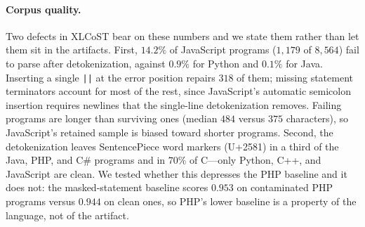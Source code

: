 \paragraph{Corpus quality.} Two defects in XLCoST bear on these numbers
and we state them rather than let them sit in the artifacts. First,
$14.2\%$ of JavaScript programs ($1{,}179$ of $8{,}564$) fail to parse
after detokenization, against $0.9\%$ for Python and $0.1\%$ for Java.
Inserting a single \texttt{||} at the error position repairs $318$ of
them; missing statement terminators account for most of the rest, since
JavaScript's automatic semicolon insertion requires newlines that the
single-line detokenization removes. Failing programs are longer than
surviving ones (median $484$ versus $375$ characters), so JavaScript's
retained sample is biased toward shorter programs. Second, the
detokenization leaves SentencePiece word markers (U+2581) in a third of
the Java, PHP, and C\# programs and in $70\%$ of C---only Python, C++, and
JavaScript are clean. We tested whether this depresses the PHP baseline
and it does not: the masked-statement baseline scores $0.953$ on
contaminated PHP programs versus $0.944$ on clean ones, so PHP's lower
baseline is a property of the language, not of the artifact.

